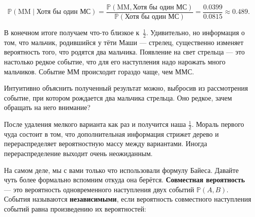 \documentclass[12pt, a4paper, oneside]{extreport}
\def \mbb{\mathbb}
\def \PP{\mbb{P}}
\newcommand{\indef}[1]{\textbf{#1}}     %
\theoremstyle{plain}              %
\theoremstyle{definition}         %
\begin{document}
\[ \PP(\text{MM} \mid \text{Хотя бы один МС}) = \frac{\PP(\text{MM}, \text{Хотя бы один МС})}{  \PP(\text{Хотя бы один МС})} = \frac{0.0399}{0.0815} \approx 0.489.\]

В конечном итоге получаем что-то близкое к~$\frac{1}{2}$.  Удивительно, но информация о том, что мальчик, родившийся у тёти Маши --- стрелец, существенно изменяет вероятность того, что родятся два мальчика. Появление на свет стрельца --- это настолько редкое событие, что для его наступления надо нарожать много мальчиков. Событие $\text{ММ}$ происходит гораздо чаще, чем $\text{ММС}$. 

Интуитивно объяснить полученный результат можно, выбросив из рассмотрения событие, при котором рождается два мальчика стрельца. Оно редкое, зачем обращать на него внимание?

\begin{center}
\end{center}

После удаления мелкого варианта как раз и получится наша $\frac{1}{2}$. Мораль первого чуда состоит в том, что дополнительная информация стрижет дерево и перераспределяет вероятностную массу между вариантами. Иногда перераспределение выходит очень неожиданным. 

На самом деле, мы с вами только что использовали формулу Байеса.  Давайте чуть более формально вспомним откуда она берётся.  \indef{Совместная вероятность} --- это вероятность одновременного наступления двух событий  $\PP(A,B)$.  События называются \indef{независимыми}, если вероятность совместного наступления событий равна произведению их вероятностей:
\end{document}
